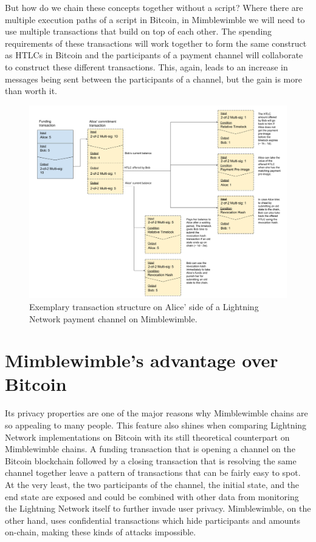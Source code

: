 \documentclass[letterpaper]{article}
\begin{document}
But how do we chain these concepts together without a script? Where there are multiple execution paths of a script in Bitcoin, in Mimblewimble we will need to use multiple transactions that build on top of each other. The spending requirements of these transactions will work together to form the same construct as HTLCs in Bitcoin and the participants of a payment channel will collaborate to construct these different transactions. This, again, leads to an increase in messages being sent between the participants of a channel, but the gain is more than worth it.

\begin{figure}[h]
	\centering
	\includegraphics[width=\textwidth]{lightning_mw_transactions_htlc}
	\caption{Exemplary transaction structure on Alice’ side of a Lightning Network payment channel on Mimblewimble.}
\end{figure}

\section{Mimblewimble's advantage over Bitcoin}
Its privacy properties are one of the major reasons why Mimblewimble chains are so appealing to many people. This feature also shines when comparing Lightning Network implementations on Bitcoin with its still theoretical counterpart on Mimblewimble chains. A funding transaction that is opening a channel on the Bitcoin blockchain followed by a closing transaction that is resolving the same channel together leave a pattern of transactions that can be fairly easy to spot. At the very least, the two participants of the channel, the initial state, and the end state are exposed and could be combined with other data from monitoring the Lightning Network itself to further invade user privacy. Mimblewimble, on the other hand, uses confidential transactions which hide participants and amounts on-chain, making these kinds of attacks impossible.
\end{document}
